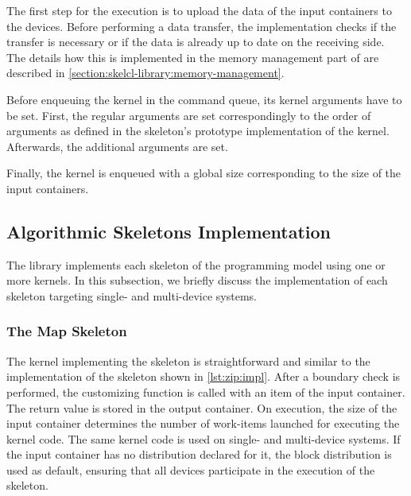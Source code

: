 The first step for the execution is to upload the data of the input containers to the \OpenCL devices.
Before performing a data transfer, the \SkelCL implementation checks if the transfer is necessary or if the data is already up to date on the receiving side.
The details how this is implemented in the memory management part of \SkelCL are described in \autoref{section:skelcl-library:memory-management}.

Before enqueuing the \OpenCL kernel in the \OpenCL command queue, its kernel arguments have to be set.
First, the regular arguments are set correspondingly to the order of arguments as defined in the skeleton's prototype implementation of the \OpenCL kernel.
Afterwards, the additional arguments are set.

Finally, the \OpenCL kernel is enqueued with a global size corresponding to the size of the input containers.










\subsection{Algorithmic Skeletons Implementation}
\label{section:skelcl-library:skeletons}
The \SkelCL library implements each skeleton of the \SkelCL programming model using one or more \OpenCL kernels.
In this subsection, we briefly discuss the implementation of each skeleton targeting single- and multi-device systems.





\subsubsection{The Map Skeleton}
The \OpenCL kernel implementing the \map skeleton is straightforward and similar to the implementation of the \zip skeleton shown in \autoref{lst:zip:impl}.
After a boundary check is performed, the customizing function is called with an item of the input container.
The return value is stored in the output container.
On execution, the size of the input container determines the number of work-items launched for executing the kernel code.
The same kernel code is used on single- and multi-device systems.
If the input container has no distribution declared for it, the block distribution is used as default, ensuring that all devices participate in the execution of the \map skeleton.

